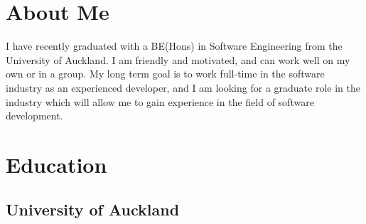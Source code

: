 \documentclass[letterpaper]{deedy-resume} %
\begin{document}



\begin{minipage}[t]{0.325\textwidth} %


\section{About Me}
I have recently graduated with a BE(Hons) in Software Engineering from the University of Auckland. I am friendly and motivated, and can work well on my own or in a group. My long term goal is to work full-time in the software industry as an experienced developer, and I am looking for a graduate role in the industry which will allow me to gain experience in the field of software development.


\section{Education} 

\subsection{University of Auckland}


\end{minipage}
\end{document}
